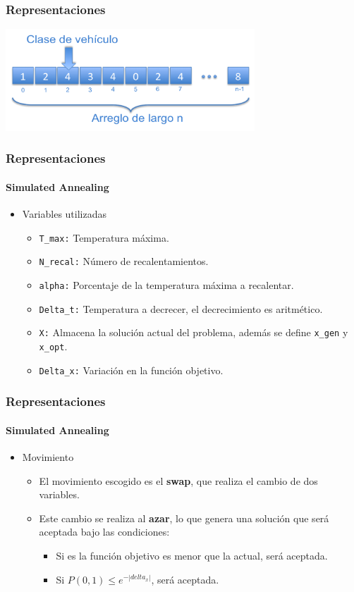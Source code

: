 \frame
{
\frametitle{Representaciones}
\begin{center}
	\includegraphics[width=0.7\textwidth]{img/representacion}
\end{center}
}

\frame
{
\frametitle{Representaciones}
\framesubtitle{Simulated Annealing}
\begin{itemize}
	\item Variables utilizadas
		\begin{itemize}
			\item {\tt T\_max:} Temperatura máxima.
        	\item {\tt N\_recal:} Número de recalentamientos.
			\item {\tt alpha:} Porcentaje de la temperatura máxima a recalentar.
			\item {\tt Delta\_t:} Temperatura a decrecer, el decrecimiento es aritmético.
			\item {\tt X:} Almacena la solución actual del problema, además se define {\tt x\_gen} y {\tt x\_opt}.
			\item {\tt Delta\_x:} Variación en la función objetivo.
		\end{itemize}
\end{itemize}
}

\frame
{
\frametitle{Representaciones}
\framesubtitle{Simulated Annealing}
\begin{itemize}
	\item Movimiento
	\begin{itemize}
		\item El movimiento escogido es el {\bf swap}, que realiza el cambio de dos variables.
		\item Este cambio se realiza al {\bf azar}, lo que genera una solución que será aceptada bajo las condiciones:
		\begin{itemize}
			\item Si es la función objetivo es menor que la actual, será aceptada.
			\item Si $P(0,1) \leq e^{-|delta_x|}$, será aceptada.
		\end{itemize}
	\end{itemize}
\end{itemize}
}

